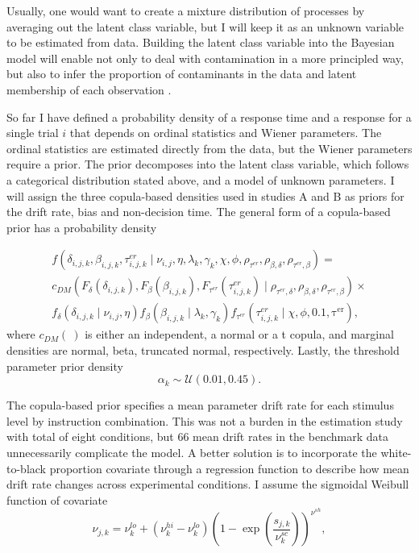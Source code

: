 \documentclass[12pt]{article}
\begin{document}
	Usually, one would want to create a mixture distribution of processes by averaging out the latent class variable, but I will keep it as an unknown variable to be estimated from data. Building the latent class variable into the Bayesian model will enable not only to deal with contamination in a more principled way, but also to infer the proportion of contaminants in the data and latent membership of each observation \citep{LeeFus2007,LeeWag2014}.
    
	So far I have defined a probability density of a response time and a response for a single trial $i$ that depends on ordinal statistics and Wiener parameters. The ordinal statistics are estimated directly from the data, but the Wiener parameters require a prior. The prior decomposes into the latent class variable, which follows a categorical distribution stated above, and a model of unknown parameters. I will assign the three copula-based densities used in studies A and B as priors for the drift rate, bias and non-decision time. The general form of a copula-based prior has a probability density 
    
\begin{gather}
f(\delta_{i,j,k},\beta_{i,j,k},\tau_{i,j,k}^{er} \mid \nu_{i,j},\eta,\lambda_k,\gamma_k,\chi,\phi,\rho_{\tau^{er}},\rho_{\beta,\delta},\rho_{\tau^{er},\beta}) = \nonumber \\
c_{DM}\left(F_{\delta}(\delta_{i,j,k}),F_{\beta}(\beta_{i,j,k}),F_{\tau^{er}}(\tau_{i,j,k}^{er}) \mid \rho_{\tau^{er},\delta},\rho_{\beta,\delta},\rho_{\tau^{er},\beta}\right)
\times \nonumber \\
f_{\delta}(\delta_{i,j,k} \mid \nu_{i,j},\eta)f_{\beta}(\beta_{i,j,k} \mid \lambda_k, \gamma_k)f_{\tau^{er}}(\tau_{i,j,k}^{er} \mid \chi, \phi, 0.1, \operatorname{\tau^{er}}),
\end{gather}
where $c_{DM}(\:)$ is either an independent, a normal or a t copula, and marginal densities are normal, beta, truncated normal, respectively. Lastly, the threshold parameter prior density
\begin{equation}
\alpha_k \sim \mathcal{U}(0.01, 0.45).
\end{equation}

	The copula-based prior specifies a mean parameter drift rate for each stimulus level by instruction combination. This was not a burden in the estimation study with total of eight conditions, but 66 mean drift rates in the benchmark data unnecessarily complicate the model. A better solution is to incorporate the white-to-black proportion covariate through a regression function to describe how mean drift rate changes across experimental conditions. I assume the sigmoidal Weibull function of covariate   
\begin{equation}
\nu_{j,k} = \nu_k^{lo}+\left(\nu_k^{hi}-\nu_k^{lo}\right)   \left( 
1 - \operatorname{exp} 
\left( 
\frac{s_{j,k}}{\nu_k^{sc}} 
\right)
\right)^{\nu^{sh}},
\end{equation}
\end{document}
